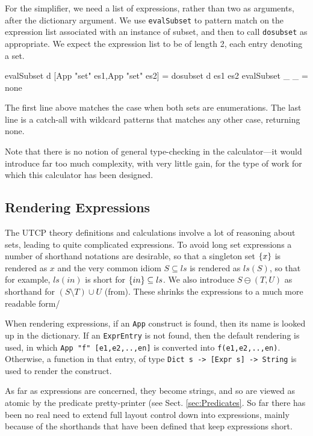 For the simplifier, we need a list of expressions,
rather than two as arguments, after the dictionary argument.
We use \texttt{evalSubset} to pattern match on the expression list
associated with an instance of subset,
and then to call \texttt{dosubset} as appropriate.
We expect the expression list to be of length 2,
each entry denoting a set.
\begin{code}
evalSubset d [App "set" es1,App "set" es2] = dosubset d es1 es2
evalSubset _ _ = none
\end{code}
The first line above matches the case when both sets are enumerations.
The last line is a catch-all with wildcard patterns that matches
any other case, returning none.

Note that there is no notion of general type-checking
in the calculator---it would introduce far too much complexity,
with very little gain,
for the type of work for which this calculator has been designed.

\subsection{Rendering Expressions}

The UTCP theory definitions and calculations
involve a lot of reasoning about sets,
leading to quite complicated expressions.
To avoid long set expressions a number of shorthand notations are desirable,
so that a singleton set $\{{x}\}$ is rendered as $x$
and the very common idiom $S \subseteq ls$
is rendered as $ls(S)$,
so that for example, $ls(in)$ is short for $\{{in}\} \subseteq ls$.
We also introduce $S \ominus (T,U)$ as shorthand for $(S \setminus T) \cup U$
(from\cite{DBLP:conf/icfem/WoodcockH02}).
These shrinks the expressions to a much more readable form/


When rendering expressions,
if an \texttt{App} construct is found, then its name
is looked up in the dictionary.
If an \texttt{ExprEntry} is not found, then the default rendering is used,
in which \verb$App "f" [e1,e2,..,en]$
is converted into \verb$f(e1,e2,..,en)$.
Otherwise, a function in that entry,
of type \verb$Dict s -> [Expr s] -> String$
is used to render the construct.

As far as expressions are concerned,
they become strings, and so are viewed as atomic
by the predicate pretty-printer (see Sect. \ref{sec:Predicates}.
So far there has been no real need to extend full layout control
down into expressions,
mainly because of the shorthands that have been defined
that keep expressions short.

